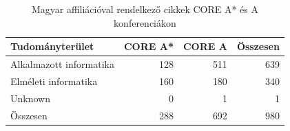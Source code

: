 \begin{table}[h]
  \centering
  \caption{Magyar affiliációval rendelkező cikkek CORE A* és A konferenciákon}
  \label{tab:hungarian_core_summary}
  \begin{tabular}{l|rr|r}
    \toprule
    Tudományterület & CORE A* & CORE A & Összesen \\
    \midrule
    Alkalmazott informatika & 128 & 511 & 639 \\
    Elméleti informatika & 160 & 180 & 340 \\
    Unknown & 0 & 1 & 1 \\
    Összesen & 288 & 692 & 980 \\
    \bottomrule
  \end{tabular}
\end{table}